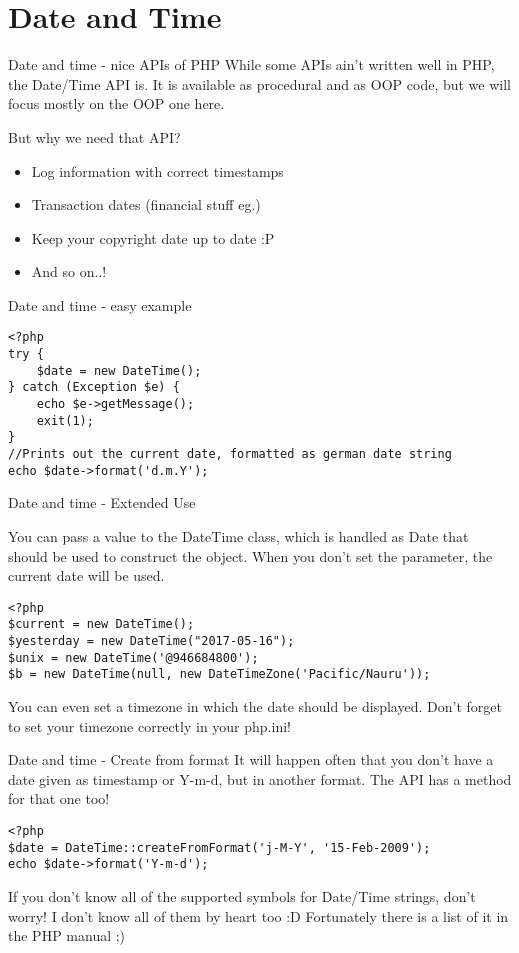 \section{Date and Time}

\begin{frame}[fragile]{Date and time - nice APIs of PHP}
While some APIs ain't written well in PHP, the Date/Time API is. It is available as procedural and as OOP code, but we will focus mostly on the OOP one here. \pause

But why we need that API? \pause

\begin{itemize}
\item Log information with correct timestamps
\item Transaction dates (financial stuff eg.)
\item Keep your copyright date up to date :P
\item And so on..!
\end{itemize}

\end{frame}

\begin{frame}[fragile]{Date and time - easy example}
\begin{lstlisting}
<?php
try {
    $date = new DateTime();
} catch (Exception $e) {
    echo $e->getMessage();
    exit(1);
}
//Prints out the current date, formatted as german date string
echo $date->format('d.m.Y');

\end{lstlisting}
\end{frame}

\begin{frame}[fragile]{Date and time - Extended Use}

You can pass a value to the DateTime class, which is handled as Date that should be  used to construct the object. When you don't set the parameter, the current date will be used. \pause

\begin{lstlisting}
<?php
$current = new DateTime();
$yesterday = new DateTime("2017-05-16");
$unix = new DateTime('@946684800');
$b = new DateTime(null, new DateTimeZone('Pacific/Nauru'));
\end{lstlisting}
\pause
You can even set a timezone in which the date should be displayed. Don't forget to set your timezone correctly in your php.ini!
\end{frame}

\begin{frame}[fragile]{Date and time - Create from format}
It will happen often that you don't have a date given as timestamp or Y-m-d, but in another format. The API has a method for that one too! \pause

\begin{lstlisting}
<?php
$date = DateTime::createFromFormat('j-M-Y', '15-Feb-2009');
echo $date->format('Y-m-d');
\end{lstlisting}
\pause
If you don't know all of the supported symbols for Date/Time strings, don't worry! I don't know all of them by heart too :D \pause Fortunately there is a list of it in the PHP manual ;)
\end{frame}

